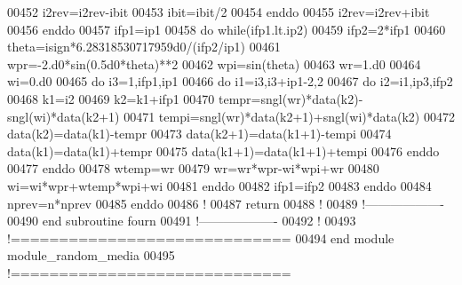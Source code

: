 \begin{DoxyCode}
00452              i2rev=i2rev-ibit
00453              ibit=ibit/2
00454           \textcolor{keyword}{enddo}
00455           i2rev=i2rev+ibit
00456        \textcolor{keyword}{enddo}
00457        ifp1=ip1
00458        \textcolor{keyword}{do} \textcolor{keyword}{while}(ifp1.lt.ip2)
00459           ifp2=2*ifp1
00460           theta=isign*6.28318530717959d0/(ifp2/ip1)
00461           wpr=-2.d0*sin(0.5d0*theta)**2
00462           wpi=sin(theta)
00463           wr=1.d0
00464           wi=0.d0
00465           \textcolor{keyword}{do} i3=1,ifp1,ip1
00466              \textcolor{keyword}{do} i1=i3,i3+ip1-2,2
00467                 \textcolor{keyword}{do} i2=i1,ip3,ifp2
00468                    k1=i2
00469                    k2=k1+ifp1
00470                    tempr=sngl(wr)*\textcolor{keyword}{data}(k2)-sngl(wi)*\textcolor{keyword}{data}(k2+1)
00471                    tempi=sngl(wr)*\textcolor{keyword}{data}(k2+1)+sngl(wi)*\textcolor{keyword}{data}(k2)
00472                    \textcolor{keyword}{data}(k2)=\textcolor{keyword}{data}(k1)-tempr
00473                    \textcolor{keyword}{data}(k2+1)=\textcolor{keyword}{data}(k1+1)-tempi
00474                    \textcolor{keyword}{data}(k1)=\textcolor{keyword}{data}(k1)+tempr
00475                    \textcolor{keyword}{data}(k1+1)=\textcolor{keyword}{data}(k1+1)+tempi
00476                 \textcolor{keyword}{enddo}
00477              \textcolor{keyword}{enddo}
00478              wtemp=wr
00479              wr=wr*wpr-wi*wpi+wr
00480              wi=wi*wpr+wtemp*wpi+wi
00481           \textcolor{keyword}{enddo}
00482           ifp1=ifp2
00483        \textcolor{keyword}{enddo}
00484        nprev=n*nprev
00485     \textcolor{keyword}{enddo}
00486     \textcolor{comment}{!}
00487     return
00488     \textcolor{comment}{!}
00489   \textcolor{comment}{!-------------------}
00490 \textcolor{keyword}{  end subroutine fourn}
00491   \textcolor{comment}{!-------------------}
00492   \textcolor{comment}{!}
00493 \textcolor{comment}{!=============================}
00494 \textcolor{keyword}{end module module\_random\_media}
00495 \textcolor{comment}{!=============================}
\end{DoxyCode}
